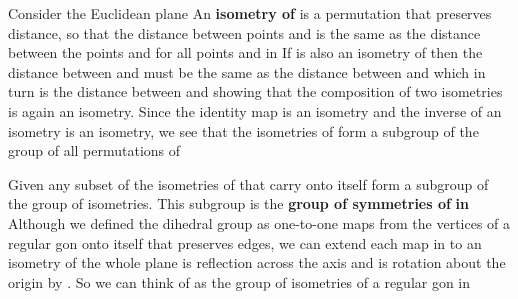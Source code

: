 \documentclass[11pt,oneside]{article}
\begin{document}
\fi
\renewcommand{\BookFooter}{Section 11 Plane Isometries}
\ifdefined\BookMaster\else\setcounter{page}{105}\fi
\BookNarrativetrue

\begin{BookBody}


\noindent Consider the Euclidean plane  An\textbf{ isometry of}  is a permutation  that preserves distance, so that the distance between points  and  is the same as the distance between the points  and  for all points  and  in  If \BookInline{\psi } is also an isometry of  then the distance between  and  must be the same as the distance between  and  which in turn is the distance between  and  showing that the composition of two isometries is again an isometry. Since the identity map is an isometry and the inverse of an isometry is an isometry, we see that the isometries of  form a subgroup of the group of all permutations of 

Given any subset  of  the isometries of  that carry  onto itself form a subgroup of the group of isometries. This subgroup is the\textbf{ group of symmetries of}  \textbf{in}  Although we defined the dihedral group  as one-to-one maps from the vertices of a regular gon onto itself that preserves edges, we can extend each map in  to an isometry of the whole plane\BookInline{;\mu } is reflection across the axis and \BookInline{\rho } is rotation about the origin by . So we can think of  as the group of isometries of a regular gon in 


\end{BookBody}
\end{document}
